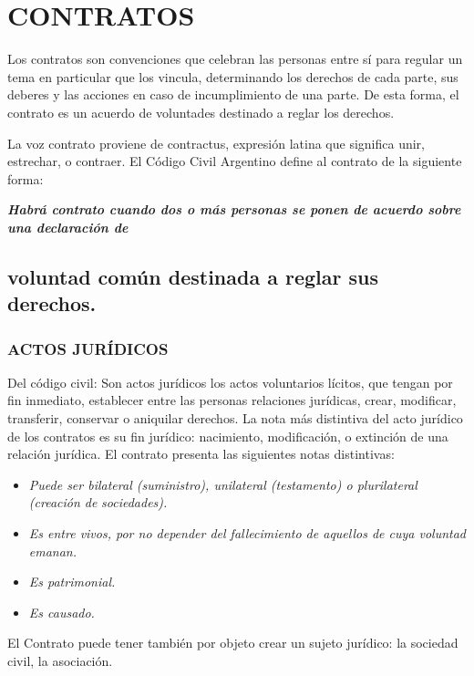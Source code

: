 \section*{CONTRATOS}
Los contratos son convenciones que celebran las personas entre sí para regular un tema en particular que los vincula, determinando los derechos de cada parte, sus deberes y las acciones en caso de incumplimiento de una parte. De esta forma, el contrato es un acuerdo de voluntades destinado a reglar los derechos.

La voz contrato proviene de contractus, expresión latina que significa unir, estrechar, o contraer. El Código Civil Argentino define al contrato de la siguiente forma:

\textbf{\textit{Habrá contrato cuando dos o más personas se ponen de acuerdo sobre una declaración de}}

\subsection*{voluntad común destinada a reglar sus derechos.}
\subsubsection*{ACTOS JURÍDICOS}
Del código civil: Son actos jurídicos los actos voluntarios lícitos, que tengan por fin inmediato, establecer entre las personas relaciones jurídicas, crear, modificar, transferir, conservar o aniquilar derechos. La nota más distintiva del acto jurídico de los contratos es su fin jurídico: nacimiento, modificación, o extinción de una relación jurídica. El contrato presenta las siguientes notas distintivas:

\begin{itemize}
  \item \textit{Puede ser bilateral (suministro), unilateral (testamento) o plurilateral (creación de} \textit{sociedades).}
  \item \textit{Es entre vivos, por no depender del fallecimiento de aquellos de cuya voluntad emanan.}
  \item \textit{Es patrimonial.}
  \item \textit{Es causado.}
\end{itemize}
El Contrato puede tener también por objeto crear un sujeto jurídico: la sociedad civil, la asociación.




